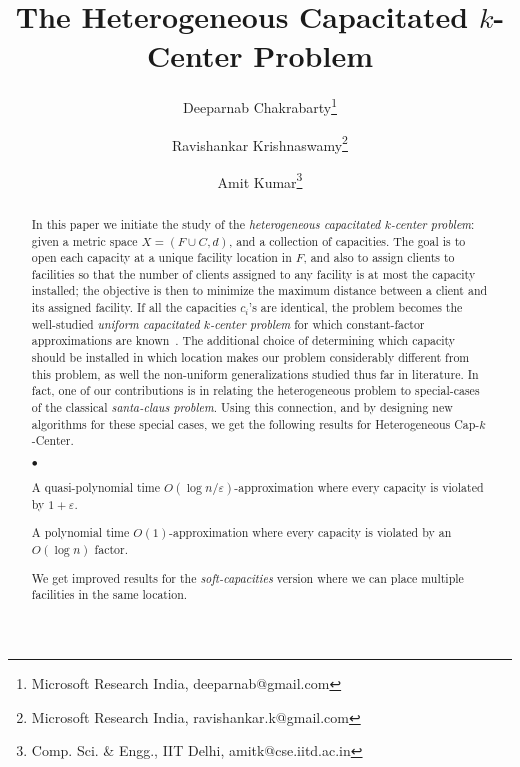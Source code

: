 \documentclass{llncs}
\def\mckc{{{\sffamily Heterogeneous Cap-$k$-Center}}\xspace}
\renewcommand{\epsilon}{\varepsilon}
\newcommand{\initOneLiners}{%
    \setlength{\itemsep}{0pt}
    \setlength{\parsep }{0pt}
    \setlength{\topsep }{0pt}
%
}
\newenvironment{oneLiners}[1][\ensuremath{\bullet}]
    {\begin{list}
        {#1}
        {\initOneLiners}}
    {\end{list}}
\begin{document}
\title{The Heterogeneous Capacitated $k$-Center Problem}
\date{}
\author{Deeparnab Chakrabarty\thanks{Microsoft Research India, deeparnab@gmail.com} \and Ravishankar Krishnaswamy\thanks{Microsoft Research India, ravishankar.k@gmail.com} \and Amit Kumar\thanks{Comp. Sci. \& Engg., IIT Delhi, amitk@cse.iitd.ac.in}}
\institute{}
\maketitle
\begin{abstract}
	In this paper we initiate the study of the {\em heterogeneous capacitated $k$-center problem}: given a metric space $X = (F \cup C, d)$, and a collection of capacities. The goal is to open each capacity at a unique facility location in $F$, and also to assign clients to facilities so that the number of clients assigned to any facility is at most the capacity installed; the objective is then to minimize the maximum distance between a client and its assigned facility. If all the capacities $c_i$'s are identical, the problem becomes the well-studied {\em uniform capacitated $k$-center problem} for which constant-factor approximations are known~\cite{Bar-IlanKP93,KhullerS00}.
The additional choice of determining which capacity should be installed in which location makes our problem considerably different from this problem, as well the non-uniform generalizations studied thus far in literature. In fact, one of our contributions is in relating the heterogeneous problem to special-cases of the classical {\em santa-claus problem}. Using this connection, and by designing new algorithms for these special cases, we get the following results for \mckc.
\begin{oneLiners}
\item A quasi-polynomial time $O(\log n/\epsilon)$-approximation where every capacity is violated by $1+\epsilon$.
\item A polynomial time $O(1)$-approximation where every capacity is violated by an $O(\log n)$ factor.
\end{oneLiners}
We get improved results for the {\em soft-capacities} version where we can place multiple facilities in the same location.
\end{abstract}


\end{document}
